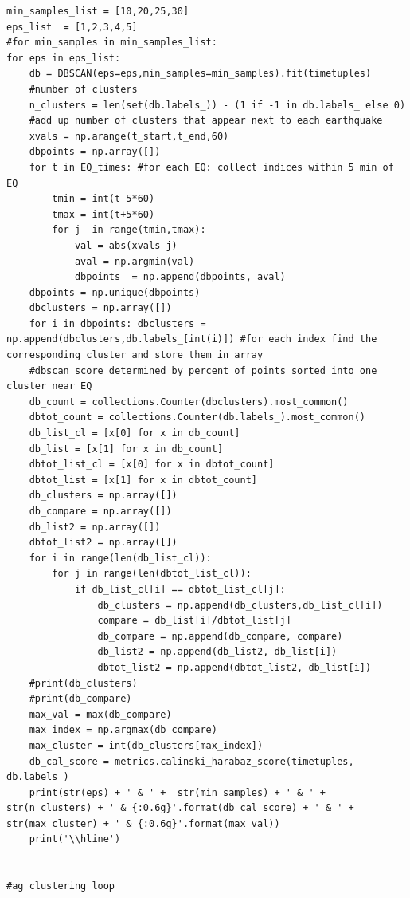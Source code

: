 \documentclass[colorlinks=true,pdfstartview=FitV,linkcolor=blue,
            citecolor=red,urlcolor=magenta]{ligodoc}
\begin{document}
\begin{verbatim}
min_samples_list = [10,20,25,30]
eps_list  = [1,2,3,4,5]
#for min_samples in min_samples_list:
for eps in eps_list:
    db = DBSCAN(eps=eps,min_samples=min_samples).fit(timetuples)
    #number of clusters
    n_clusters = len(set(db.labels_)) - (1 if -1 in db.labels_ else 0)
    #add up number of clusters that appear next to each earthquake
    xvals = np.arange(t_start,t_end,60)
    dbpoints = np.array([])
    for t in EQ_times: #for each EQ: collect indices within 5 min of EQ
        tmin = int(t-5*60)
        tmax = int(t+5*60)
        for j  in range(tmin,tmax):
            val = abs(xvals-j)
            aval = np.argmin(val)
            dbpoints  = np.append(dbpoints, aval)
    dbpoints = np.unique(dbpoints)
    dbclusters = np.array([])
    for i in dbpoints: dbclusters = np.append(dbclusters,db.labels_[int(i)]) #for each index find the corresponding cluster and store them in array
    #dbscan score determined by percent of points sorted into one cluster near EQ
    db_count = collections.Counter(dbclusters).most_common()
    dbtot_count = collections.Counter(db.labels_).most_common()
    db_list_cl = [x[0] for x in db_count]
    db_list = [x[1] for x in db_count]
    dbtot_list_cl = [x[0] for x in dbtot_count]
    dbtot_list = [x[1] for x in dbtot_count]
    db_clusters = np.array([])
    db_compare = np.array([])
    db_list2 = np.array([])
    dbtot_list2 = np.array([])
    for i in range(len(db_list_cl)):
        for j in range(len(dbtot_list_cl)):
            if db_list_cl[i] == dbtot_list_cl[j]:
                db_clusters = np.append(db_clusters,db_list_cl[i])
                compare = db_list[i]/dbtot_list[j]
                db_compare = np.append(db_compare, compare)
                db_list2 = np.append(db_list2, db_list[i])
                dbtot_list2 = np.append(dbtot_list2, db_list[i])
    #print(db_clusters)
    #print(db_compare)
    max_val = max(db_compare)
    max_index = np.argmax(db_compare)
    max_cluster = int(db_clusters[max_index])
    db_cal_score = metrics.calinski_harabaz_score(timetuples, db.labels_)
    print(str(eps) + ' & ' +  str(min_samples) + ' & ' +  str(n_clusters) + ' & {:0.6g}'.format(db_cal_score) + ' & ' + str(max_cluster) + ' & {:0.6g}'.format(max_val))
    print('\\hline')
   
 
#ag clustering loop


\end{verbatim}
\end{document}
